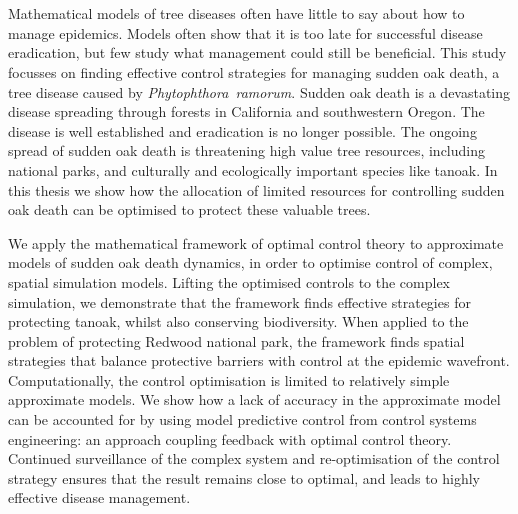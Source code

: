 %

\let\cleardoublepage\relax
{}

{\chapter*{}}
\label{sec:abstract}
\vspace*{-10mm}
\thispagestyle{empty}

\begin{center}
    {\Large\thesisTitle}
    
    \vspace*{5mm}
    
    {\large\thesisName}
    \vspace*{10mm}
\end{center}

Mathematical models of tree diseases often have little to say about how to manage epidemics. Models often show that it is too late for successful disease eradication, but few study what management could still be beneficial. This study focusses on finding effective control strategies for managing sudden oak death, a tree disease caused by \emph{Phytophthora~ramorum}. Sudden oak death is a devastating disease spreading through forests in California and southwestern Oregon. The disease is well established and eradication is no longer possible. The ongoing spread of sudden oak death is threatening high value tree resources, including national parks, and culturally and ecologically important species like tanoak. In this thesis we show how the allocation of limited resources for controlling sudden oak death can be optimised to protect these valuable trees.

We apply the mathematical framework of optimal control theory to approximate models of sudden oak death dynamics, in order to optimise control of complex, spatial simulation models. Lifting the optimised controls to the complex simulation, we demonstrate that the framework finds effective strategies for protecting tanoak, whilst also conserving biodiversity. When applied to the problem of protecting Redwood national park, the framework finds spatial strategies that balance protective barriers with control at the epidemic wavefront. Computationally, the control optimisation is limited to relatively simple approximate models. We show how a lack of accuracy in the approximate model can be accounted for by using model predictive control from control systems engineering: an approach coupling feedback with optimal control theory. Continued surveillance of the complex system and re-optimisation of the control strategy ensures that the result remains close to optimal, and leads to highly effective disease management.

